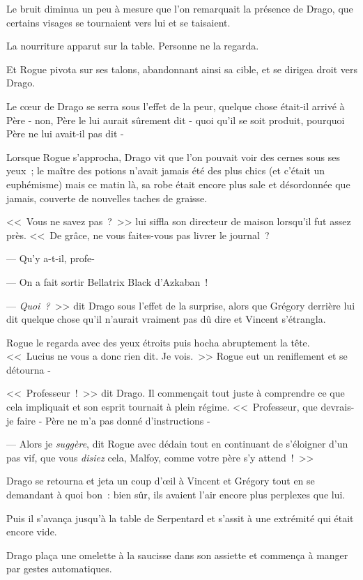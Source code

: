 Le bruit diminua un peu à mesure que l'on remarquait la présence de Drago, que certains visages se tournaient vers lui et se taisaient.

La nourriture apparut sur la table. Personne ne la regarda.

Et Rogue pivota sur ses talons, abandonnant ainsi sa cible, et se dirigea droit vers Drago.

Le cœur de Drago se serra sous l'effet de la peur, quelque chose était-il arrivé à Père - non, Père le lui aurait sûrement dit - quoi qu'il se soit produit, pourquoi Père ne lui avait-il pas dit -

Lorsque Rogue s'approcha, Drago vit que l'on pouvait voir des cernes sous ses yeux~; le maître des potions n'avait jamais été des plus chics (et c'était un euphémisme) mais ce matin là, sa robe était encore plus sale et désordonnée que jamais, couverte de nouvelles taches de graisse.

<<~Vous ne savez pas~?~>> lui siffla son directeur de maison lorsqu'il fut assez près. <<~De grâce, ne vous faites-vous pas livrer le journal~?

--- Qu'y a-t-il, profe-

--- On a fait sortir Bellatrix Black d'Azkaban~!

--- \emph{Quoi~?}~>> dit Drago sous l'effet de la surprise, alors que Grégory derrière lui dit quelque chose qu'il n'aurait vraiment pas dû dire et Vincent s'étrangla.

Rogue le regarda avec des yeux étroits puis hocha abruptement la tête. <<~Lucius ne vous a donc rien dit. Je vois.~>> Rogue eut un reniflement et se détourna -

<<~Professeur~!~>> dit Drago. Il commençait tout juste à comprendre ce que cela impliquait et son esprit tournait à plein régime. <<~Professeur, que devrais-je faire - Père ne m'a pas donné d'instructions -

--- Alors je \emph{suggère}, dit Rogue avec dédain tout en continuant de s'éloigner d'un pas vif, que vous \emph{disiez} cela, Malfoy, comme votre père s'y attend~!~>>

Drago se retourna et jeta un coup d'œil à Vincent et Grégory tout en se demandant à quoi bon~: bien sûr, ils avaient l'air encore plus perplexes que lui.

Puis il s'avança jusqu'à la table de Serpentard et s'assit à une extrémité qui était encore vide.

Drago plaça une omelette à la saucisse dans son assiette et commença à manger par gestes automatiques.

